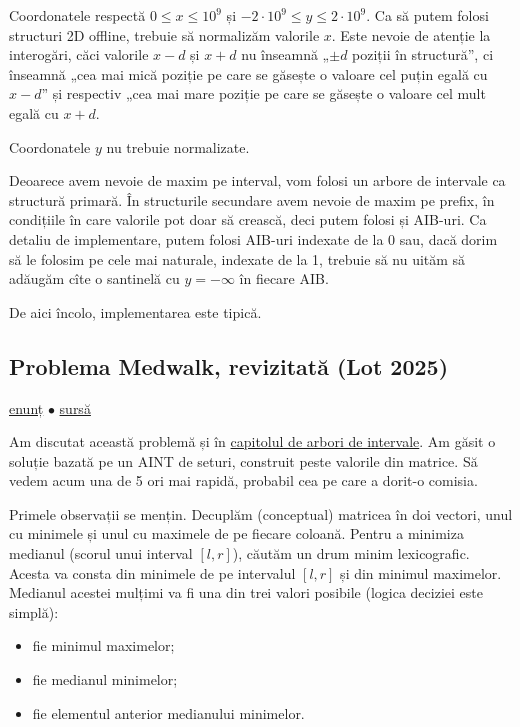 Coordonatele respectă $0 \leq x \leq 10^9$ și $-2 \cdot 10^9 \leq y \leq 2 \cdot 10^9$. Ca să putem folosi structuri 2D offline, trebuie să normalizăm valorile $x$. Este nevoie de atenție la interogări, căci valorile $x - d$ și $x + d$ nu înseamnă „$\pm d$ poziții în structură”, ci înseamnă „cea mai mică poziție pe care se găsește o valoare cel puțin egală cu $x - d$” și respectiv „cea mai mare poziție pe care se găsește o valoare cel mult egală cu $x + d$.

Coordonatele $y$ nu trebuie normalizate.

Deoarece avem nevoie de maxim pe interval, vom folosi un arbore de intervale ca structură primară. În structurile secundare avem nevoie de maxim pe prefix, în condițiile în care valorile pot doar să crească, deci putem folosi și AIB-uri. Ca detaliu de implementare, putem folosi AIB-uri indexate de la 0 sau, dacă dorim să le folosim pe cele mai naturale, indexate de la 1, trebuie să nu uităm să adăugăm cîte o santinelă cu $y = -\infty$ în fiecare AIB.

De aici încolo, implementarea este tipică.

\subsection{Problema Medwalk, revizitată (Lot 2025)}
\label{problem:medwalk-fenwick}

\href{https://kilonova.ro/problems/3790}{enunț}
$\bullet$
\hyperref[code:medwalk-fenwick]{sursă}

Am discutat această problemă și în \hyperref[problem:medwalk]{capitolul de arbori de intervale}. Am găsit o soluție bazată pe un AINT de seturi, construit peste valorile din matrice. Să vedem acum una de 5 ori mai rapidă, probabil cea pe care a dorit-o comisia.

Primele observații se mențin. Decuplăm (conceptual) matricea în doi vectori, unul cu minimele și unul cu maximele de pe fiecare coloană. Pentru a minimiza medianul (scorul unui interval $[l, r]$), căutăm un drum minim lexicografic. Acesta va consta din minimele de pe intervalul $[l, r]$ și din minimul maximelor. Medianul acestei mulțimi va fi una din trei valori posibile (logica deciziei este simplă):

\begin{itemize}
  \item fie minimul maximelor;
  \item fie medianul minimelor;
  \item fie elementul anterior medianului minimelor.
\end{itemize}


